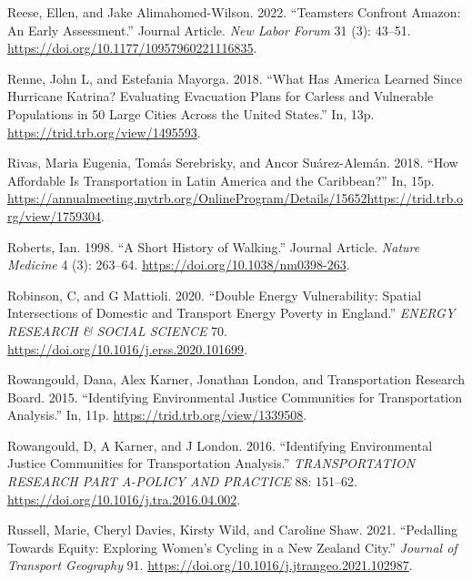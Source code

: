 \documentclass[12pt, oneside]{report}
\newlength{\cslhangindent}
\newlength{\cslentryspacingunit} %
\newenvironment{CSLReferences}[2] %
 {%
  \setlength{\parindent}{0pt}
  \ifodd #1
  \let\oldpar\par
  \def\par{\hangindent=\cslhangindent\oldpar}
  \fi
  \setlength{\parskip}{#2\cslentryspacingunit}
 }%
 {}
\begin{document}
\begin{CSLReferences}{1}{0}
\leavevmode{}%
Reese, Ellen, and Jake Alimahomed-Wilson. 2022. {``Teamsters Confront
Amazon: An Early Assessment.''} Journal Article. \emph{New Labor Forum}
31 (3): 43--51. \url{https://doi.org/10.1177/10957960221116835}.

\leavevmode{}%
Renne, John L, and Estefania Mayorga. 2018. {``What {Has America Learned
Since Hurricane Katrina}? {Evaluating Evacuation Plans} for {Carless}
and {Vulnerable Populations} in 50 {Large Cities Across} the {United
States}.''} In, 13p. \url{https://trid.trb.org/view/1495593}.

\leavevmode{}%
Rivas, Maria Eugenia, Tomás Serebrisky, and Ancor Suárez-Alemán. 2018.
{``How Affordable Is Transportation in Latin America and the
Caribbean?''} In, 15p.
\url{https://annualmeeting.mytrb.org/OnlineProgram/Details/15652https://trid.trb.org/view/1759304}.

\leavevmode{}%
Roberts, Ian. 1998. {``A Short History of Walking.''} Journal Article.
\emph{Nature Medicine} 4 (3): 263--64.
\url{https://doi.org/10.1038/nm0398-263}.

\leavevmode{}%
Robinson, C, and G Mattioli. 2020. {``Double Energy Vulnerability:
{Spatial} Intersections of Domestic and Transport Energy Poverty in
{England}.''} \emph{ENERGY RESEARCH \& SOCIAL SCIENCE} 70.
\url{https://doi.org/10.1016/j.erss.2020.101699}.

\leavevmode{}%
Rowangould, Dana, Alex Karner, Jonathan London, and Transportation
Research Board. 2015. {``Identifying {Environmental Justice Communities}
for {Transportation Analysis}.''} In, 11p.
\url{https://trid.trb.org/view/1339508}.

\leavevmode{}%
Rowangould, D, A Karner, and J London. 2016. {``Identifying
Environmental Justice Communities for Transportation Analysis.''}
\emph{TRANSPORTATION RESEARCH PART A-POLICY AND PRACTICE} 88: 151--62.
\url{https://doi.org/10.1016/j.tra.2016.04.002}.

\leavevmode{}%
Russell, Marie, Cheryl Davies, Kirsty Wild, and Caroline Shaw. 2021.
{``Pedalling Towards Equity: {Exploring} Women's Cycling in a {New
Zealand} City.''} \emph{Journal of Transport Geography} 91.
\url{https://doi.org/10.1016/j.jtrangeo.2021.102987}.


\end{CSLReferences}
\end{document}
